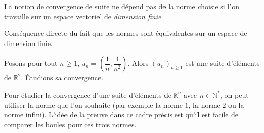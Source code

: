 \documentclass[a4paper,10pt]{report}
\begin{document}
\begin{Theoreme}{} La notion de convergence de suite ne dépend pas de la norme choisie si l'on travaille sur un espace vectoriel de \emph{dimension finie}.
\end{Theoreme}

\begin{Demonstration}{} Conséquence directe du fait que les normes sont équivalentes sur un espace de dimension finie.
\end{Demonstration}

\begin{Exemple} Posons pour tout $n \geq 1$, $u_n = \left( \dfrac{1}{n}, \dfrac{1}{n^2} \right)$. Alors $(u_n)_{n \geq 1}$ est une suite d'éléments de $\mathbb{R}^2$. Étudions sa convergence.

%
%
%

\vspace{6cm}
\end{Exemple}

%

\begin{Exemple} Pour étudier la convergence d'une suite d'éléments de $\mathbb{K}^n$ avec $n \in \mathbb{N}^*$, on peut utiliser la norme que l'on souhaite (par exemple la norme $1$, la norme $2$ ou la norme infini). L'idée de la preuve dans ce cadre précis est qu'il est facile de comparer les boules pour ces trois normes.
\end{Exemple}
\end{document}

